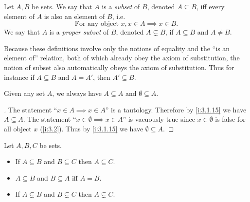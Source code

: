\begin{defn}[Subsets]\label{i:3.1.15}
  Let \(A, B\) be sets.
  We say that \(A\) is a \emph{subset} of \(B\), denoted \(A \subseteq B\), iff every element of \(A\) is also an element of \(B\), i.e.
  \[
    \text{For any object } x, x \in A \implies x \in B.
  \]
  We say that \(A\) is a \emph{proper subset} of \(B\), denoted \(A \subsetneq B\), if \(A \subseteq B\) and \(A \neq B\).
\end{defn}

\begin{rmk}\label{i:3.1.16}
  Because these definitions involve only the notions of equality and the ``is an element of'' relation, both of which already obey the axiom of substitution, the notion of subset also automatically obeys the axiom of substitution.
  Thus for instance if \(A \subseteq B\) and \(A = A'\), then \(A' \subseteq B\).
\end{rmk}

\begin{eg}\label{i:3.1.17}
  Given any set \(A\), we always have \(A \subseteq A\) and \(\emptyset \subseteq A\).
\end{eg}

\begin{proof}[]
  The statement ``\(x \in A \implies x \in A\)'' is a tautology.
  Therefore by \cref{i:3.1.15} we have \(A \subseteq A\).
  The statement ``\(x \in \emptyset \implies x \in A\)'' is vacuously true since \(x \in \emptyset\) is false for all object \(x\) (\cref{i:3.2}).
  Thus by \cref{i:3.1.15} we have \(\emptyset \subseteq A\).
\end{proof}

\begin{prop}\label{i:3.1.18}
  Let \(A, B, C\) be sets.
  \begin{itemize}
    \item If \(A \subseteq B\) and \(B \subseteq C\) then \(A \subseteq C\).
    \item \(A \subseteq B\) and \(B \subseteq A\) iff \(A = B\).
    \item If \(A \subsetneq B\) and \(B \subsetneq C\) then \(A \subsetneq C\).
  \end{itemize}
\end{prop}

